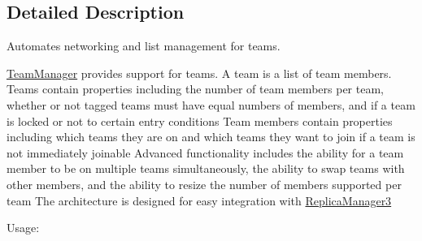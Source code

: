 \subsection{Detailed Description}
Automates networking and list management for teams. 

\hyperlink{class_rak_net_1_1_team_manager}{Team\-Manager} provides support for teams. A team is a list of team members. Teams contain properties including the number of team members per team, whether or not tagged teams must have equal numbers of members, and if a team is locked or not to certain entry conditions Team members contain properties including which teams they are on and which teams they want to join if a team is not immediately joinable Advanced functionality includes the ability for a team member to be on multiple teams simultaneously, the ability to swap teams with other members, and the ability to resize the number of members supported per team The architecture is designed for easy integration with \hyperlink{class_rak_net_1_1_replica_manager3}{Replica\-Manager3}

Usage\-:\par

